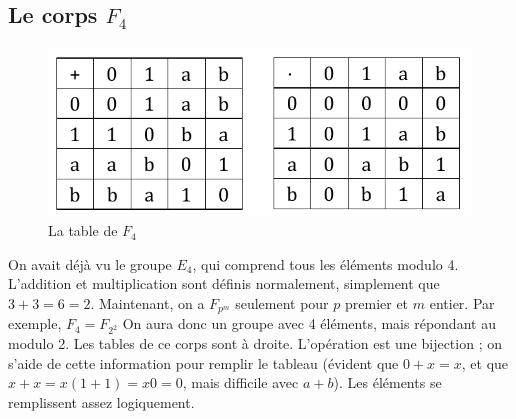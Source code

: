 \documentclass[11pt,a4paper]{article}
\renewcommand{\)}{\right)}
\renewcommand{\(}{\left(}
\begin{document}
\subsection{Le corps $F_4$}
\begin{figure}
	\centering
	\includegraphics[scale=0.5]{images/tables}
	\caption{La table de $F_4$}
	\label{f4}
\end{figure}
On avait déjà vu le groupe $E_4$, qui comprend tous les éléments modulo 4. L'addition et multiplication sont définis normalement, simplement que $3+3 = 6 = 2$. Maintenant, on a $F_{p^m}$ seulement pour $p$ premier et $m$ entier. Par exemple, $F_4 = F_{2^2}$ On aura donc un groupe avec 4 éléments, mais répondant au modulo 2. Les tables de ce corps sont à droite. L'opération est une bijection ; on s'aide de cette information pour remplir le tableau (évident que $0+x = x$, et que $x+x = x(1+1) = x0 = 0$, mais difficile avec $a+b$). Les éléments se remplissent assez logiquement.
\end{document}
